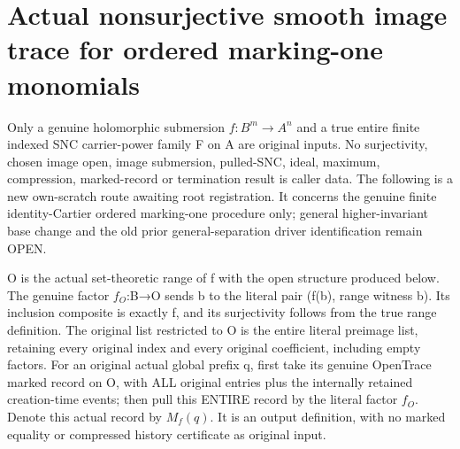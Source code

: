 \section{Actual nonsurjective smooth image trace for ordered marking-one monomials}
Only a genuine holomorphic submersion $f:B^m→A^n$ and a true entire finite indexed SNC carrier-power family F on A are original inputs. No surjectivity, chosen image open, image submersion, pulled-SNC, ideal, maximum, compression, marked-record or termination result is caller data. The following is a new own-scratch route awaiting root registration. It concerns the genuine finite identity-Cartier ordered marking-one procedure only; general higher-invariant base change and the old prior general-separation driver identification remain OPEN.

\begin{definition}
\label{hir:submersion-image-trace-factor}
\leanok
{}
O is the actual set-theoretic range of f with the open structure produced below. The genuine factor $f_O$:B→O sends b to the literal pair (f(b), range witness b). Its inclusion composite is exactly f, and its surjectivity follows from the true range definition. The original list restricted to O is the entire literal preimage list, retaining every original index and every original coefficient, including empty factors. For an original actual global prefix q, first take its genuine OpenTrace marked record on O, with ALL original entries plus the internally retained creation-time events; then pull this ENTIRE record by the literal factor $f_O$. Denote this actual record by $M_f(q)$. It is an output definition, with no marked equality or compressed history certificate as original input.
\end{definition}


